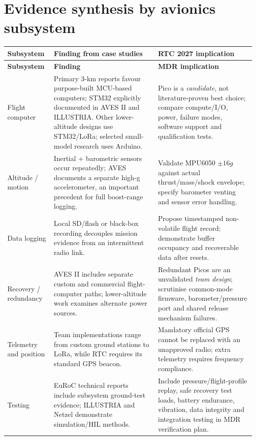 \documentclass[10pt,a4paper]{article}
\begin{document}
\section{Evidence synthesis by avionics subsystem}
\small
\begin{longtable}{@{}L{31mm}L{72mm}L{39mm}@{}}
\toprule{}\textbf{Subsystem} & \textbf{Finding from case studies} & \textbf{RTC 2027 implication}\\\midrule\endfirsthead
\toprule{}\textbf{Subsystem} & \textbf{Finding} & \textbf{MDR implication}\\\midrule\endhead
\bottomrule\endlastfoot
Flight computer & Primary 3-km reports favour purpose-built MCU-based computers; STM32 explicitly documented in AVES II and ILLUSTRIA. Other lower-altitude designs use STM32/LoRa; selected small-model research uses Arduino. \cite{astg2022aves2,zlamala2024,zapadlo2023,moschidis2022} & Pico is a \emph{candidate}, not literature-proven best choice; compare compute/I/O, power, failure modes, software support and qualification tests.\\
Altitude / motion & Inertial + barometric sensors occur repeatedly; AVES documents a separate high-g accelerometer, an important precedent for full boost-range logging. \cite{astg2021aves,netzel2026} & Validate MPU6050 $\pm16g$ against actual thrust/mass/shock envelope; specify barometer venting and sensor error handling.\\
Data logging & Local SD/flash or black-box recording decouples mission evidence from an intermittent radio link. \cite{astg2021aves,astg2022aves2,netzel2026} & Propose timestamped non-volatile flight record; demonstrate buffer occupancy and recoverable data after resets.\\
Recovery / redundancy & AVES II includes separate custom and commercial flight-computer paths; lower-altitude work examines alternate power sources. \cite{astg2022aves2,zapadlo2023} & Redundant Picos are an unvalidated \emph{team design}; scrutinise common-mode firmware, barometer/pressure port and shared release mechanism failures.\\
Telemetry and position & Team implementations range from custom ground stations to LoRa, while RTC requires its standard GPS beacon. \cite{astg2021aves,zapadlo2023,andrade2022,rtc2027rules} & Mandatory official GPS cannot be replaced with an unapproved radio; extra telemetry requires frequency compliance.\\
Testing & EuRoC technical reports include subsystem ground-test evidence; ILLUSTRIA and Netzel demonstrate simulation/HIL methods. \cite{astg2022aves2,zlamala2024,netzel2026} & Include pressure/flight-profile replay, safe recovery test loads, battery endurance, vibration, data integrity and integration testing in MDR verification plan.\\
\end{longtable}
\normalsize
\end{document}
